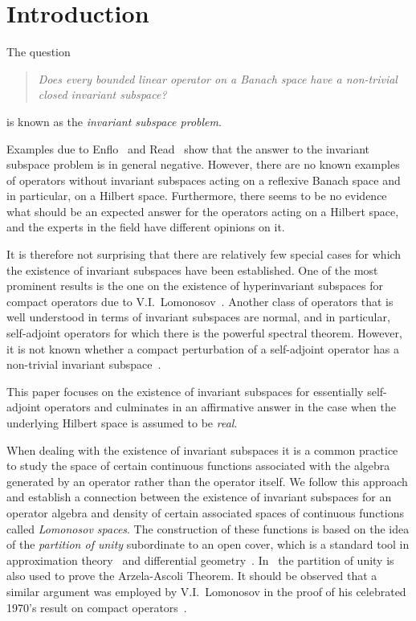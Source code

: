 \documentclass{tran-l}
\theoremstyle{definition}
\theoremstyle{remark}
\numberwithin{equation}{subsection}
\begin{document}
\section*{Introduction}

The question
\begin{quote}
  \emph{Does every bounded linear operator on a Banach space have a non-trivial closed invariant subspace?}
\end{quote}
is known as the \emph{invariant subspace problem}.

\smallskip

Examples due to Enflo~\cite{Enf87} and Read~\cite{Rea85} show that the answer to the invariant subspace problem is in general negative. However, there are no known examples of operators without invariant subspaces acting on a reflexive Banach space and in particular, on a Hilbert space. Furthermore, there seems to be no evidence what should be an expected answer for the operators acting on a Hilbert space, and the experts in the field have different opinions on it.

It is therefore not surprising that there are relatively few special cases for which the existence of invariant subspaces have been established. One of the most prominent results is the one on the existence of hyperinvariant subspaces for compact operators due to V.I.~Lomonosov~\cite{Lom73,RR73}. Another class of operators that is well understood in terms of invariant subspaces are normal, and in particular, self-adjoint operators for which there is the powerful spectral theorem. However, it is not known whether a compact perturbation of a self-adjoint operator has a non-trivial invariant subspace~\cite{Lom92}.

This paper focuses on the existence of invariant subspaces for essentially self-adjoint operators and culminates in an affirmative answer in the case when the underlying Hilbert space is assumed to be \emph{real}.

When dealing with the existence of invariant subspaces it is a common practice~\cite{AAB95,dB93,Lom91,Sim96a} to study the space of certain continuous functions associated with the algebra generated by an operator rather than the operator itself. We follow this approach and establish a connection between the existence of invariant subspaces for an operator algebra and density of certain associated spaces of continuous functions called \emph{Lomonosov spaces}. The construction of these functions is based on the idea of the \emph{partition of unity} subordinate to an open cover, which is a standard tool in approximation theory~\cite{Gam90} and differential geometry~\cite{Dev68,Spi65}. In~\cite{Dev68} the partition of unity is also used to prove the Arzela-Ascoli Theorem. It should be observed that a similar argument was employed by V.I.~Lomonosov in the proof of his celebrated 1970's result on compact operators~\cite{Lom73}.
\end{document}
